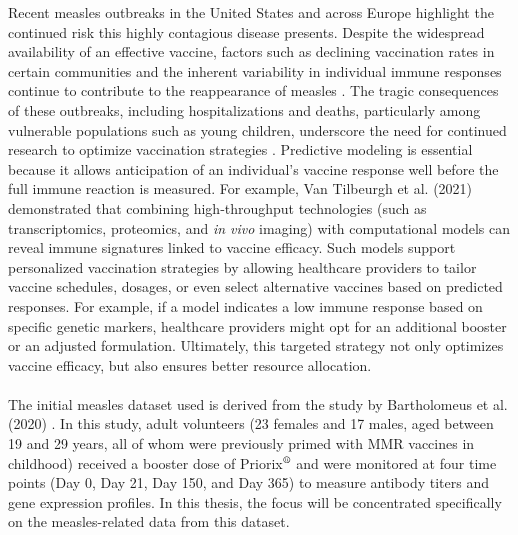 \documentclass[12pt,a4paper]{report}
\newcommand{\todo}[1]{%
  \par\noindent%
  \begin{tcolorbox}[colback=yellow, colframe=black, boxrule=0.5pt, sharp corners, width=\linewidth, before skip=5pt, after skip=5pt]
    \textbf{TODO:} #1
  \end{tcolorbox}%
  \par
}
\newcommand{\remark}[1]{%
  \par\noindent%
  \begin{tcolorbox}[ colback=orange!20!white, colframe=orange!80!black, boxrule=0.5pt, sharp corners, width=\linewidth, ]
    {\textbf{\textcolor{orange!80!black}!REMARK:}}~#1
  \end{tcolorbox}%
}
\begin{document}
Recent measles outbreaks in the United States and across Europe highlight the continued risk this highly contagious disease presents. Despite the widespread availability of an effective vaccine, factors such as declining vaccination rates in certain communities and the inherent variability in individual immune responses continue to contribute to the reappearance of measles \cite{Broom2025Measles,WHOEuropeUNICEF2025Measles,CDC2025MeaslesData}. The tragic consequences of these outbreaks, including hospitalizations and deaths, particularly among vulnerable populations such as young children, underscore the need for continued research to optimize vaccination strategies \cite{moss2017measles}. Predictive modeling is essential because it allows anticipation of an individual’s vaccine response well before the full immune reaction is measured. For example, Van Tilbeurgh et al. (2021) \cite{vanTilbeurgh2021predictive} demonstrated that combining high‑throughput technologies (such as transcriptomics, proteomics, and \textit{in vivo} imaging) with computational models can reveal immune signatures linked to vaccine efficacy. Such models support personalized vaccination strategies by allowing healthcare providers to tailor vaccine schedules, dosages, or even select alternative vaccines based on predicted responses. For example, if a model indicates a low immune response based on specific genetic markers, healthcare providers might opt for an additional booster or an adjusted formulation. Ultimately, this targeted strategy not only optimizes vaccine efficacy, but also ensures better resource allocation.\\
\\
The initial measles dataset used is derived from the study by Bartholomeus et al. (2020) \cite{bartholomeus2020transcriptomic}.
In this study, adult volunteers (23 females and 17 males, aged between 19 and 29 years, all of whom were previously primed with MMR vaccines in childhood) received a booster dose of Priorix$^{\mbox{\scriptsize\textregistered}}$ and were monitored at four time points (Day 0, Day 21, Day 150, and Day 365) to measure antibody titers and gene expression profiles. In this thesis, the focus will be concentrated specifically on the measles-related data from this dataset. \\
\end{document}
